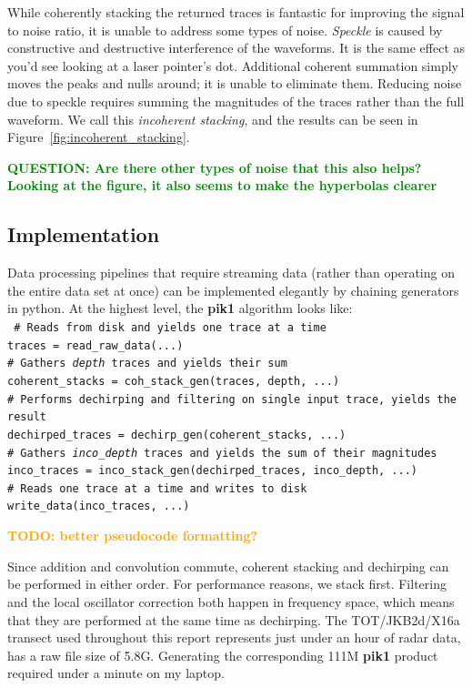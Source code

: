\documentclass[11pt]{article}
\newcommand{\future}[1]{\ifthenelse{\boolean{include-future}} {\textcolor{Orange}{\textbf{TODO: #1}}}{}}
\newcommand{\question}[1]{\ifthenelse{\boolean{include-questions}} {\textcolor{Green}{\textbf{QUESTION: #1}}}{}}
\newcommand{\figref}[1]{Figure~\ref{#1}}
\begin{document}
While coherently stacking the returned traces is fantastic for improving the signal to noise ratio, it is unable to address some types of noise.
\emph{Speckle} is caused by constructive and destructive interference of the waveforms. It is the same effect as you'd see looking at a laser pointer's dot. Additional coherent summation simply moves the peaks and nulls around; it is unable to eliminate them. Reducing noise due to speckle requires summing the magnitudes of the traces rather than the full waveform. We call this \emph{incoherent stacking}, and the results can be seen in \figref{fig:incoherent_stacking}.

\question{Are there other types of noise that this also helps? Looking at the figure, it also seems to make the hyperbolas clearer}



\subsection{Implementation}

Data processing pipelines that require streaming data (rather than operating on the entire data set at once) can be implemented elegantly by chaining generators in python. At the highest level, the \textbf{pik1} algorithm looks like:\\

\texttt{
\# Reads from disk and yields one trace at a time \\
traces = read\_raw\_data(...) \\
\# Gathers \emph{depth} traces and yields their sum \\
coherent\_stacks = coh\_stack\_gen(traces, depth, ...) \\
\# Performs dechirping and filtering on single input trace, yields the result \\
dechirped\_traces = dechirp\_gen(coherent\_stacks, ...) \\
\# Gathers \emph{inco\_depth} traces and yields the sum of their magnitudes \\
inco\_traces = inco\_stack\_gen(dechirped\_traces, inco\_depth, ...) \\
\# Reads one trace at a time and writes to disk \\
write\_data(inco\_traces, ...) \\
} %

\future{better pseudocode formatting?}

Since addition and convolution commute, coherent stacking and dechirping can be performed in either order. For performance reasons, we stack first. Filtering and the local oscillator correction both happen in frequency space, which means that they are performed at the same time as dechirping. The TOT/JKB2d/X16a transect used throughout this report represents just under an hour of radar data, has a raw file size of 5.8G. Generating the corresponding 111M \textbf{pik1} product required under a minute on my laptop.
\end{document}
